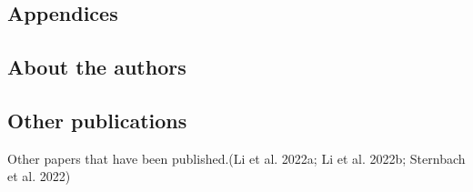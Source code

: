 \documentclass[
  letterpaper,
  DIV=11,
  numbers=noendperiod]{scrartcl}
\begin{document}
\hypertarget{appendices}{%
\subsection{Appendices}\label{appendices}}

\hypertarget{about-the-authors}{%
\subsection{About the authors}\label{about-the-authors}}

\hypertarget{other-publications}{%
\subsection{Other publications}\label{other-publications}}

Other papers that have been published.(Li et al. 2022a; Li et al. 2022b;
Sternbach et al. 2022)
\end{document}
